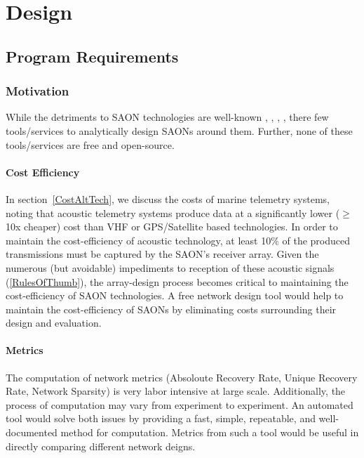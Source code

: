 \chapter{Design}
\label{design}
\section{Program Requirements}
\label{programRequirements}

\subsection{Motivation}
While the detriments to SAON technologies are well-known \cite{Akbarzadeh2013}, \cite{Heupel2006}, \cite{Howard2002},  \cite{Kessel2015}, \cite{Steel2014} there few tools/services to analytically design SAONs around them.  Further, none of these tools/services are free and open-source.


\subsubsection{Cost Efficiency}
\label{motivationCost}
In section~\ref{CostAltTech}, we discuss the costs of marine telemetry systems, noting that acoustic telemetry systems produce data at a significantly lower ($\ge$10x cheaper) cost than VHF or GPS/Satellite based technologies.  In order to maintain the cost-efficiency of acoustic technology, at least 10$\%$ of the produced transmissions must be captured by the SAON's receiver array.  Given the numerous (but avoidable) impediments to reception of these acoustic signals (\ref{RulesOfThumb}), the array-design process becomes critical to maintaining the cost-efficiency of SAON technologies.  A free network design tool would help to maintain the cost-efficiency of SAONs by eliminating costs surrounding their design and evaluation.  


\subsubsection{Metrics}
\label{motivationMetrics}
The computation of network metrics (Absoloute Recovery Rate, Unique Recovery Rate, Network Sparsity) is very labor intensive at large scale.  Additionally, the process of computation may vary from experiment to experiment.  An automated tool would solve both issues by providing a fast, simple, repeatable, and well-documented method for computation.  Metrics from such a tool would be useful in directly comparing different network deigns.



